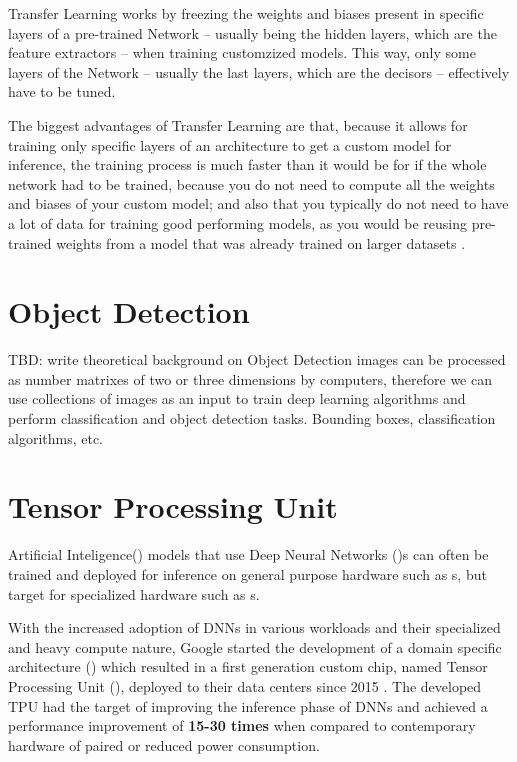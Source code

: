\documentclass[openright]{normas-utf-tex} %
\begin{document}
Transfer Learning works by freezing the weights and biases present in specific layers of a
pre-trained Network -- usually being the hidden layers, which are the feature extractors -- 
when training customzized models. This way,  only some layers of the Network -- usually the last layers, which 
are the decisors -- effectively have to be tuned.

The biggest advantages of Transfer Learning are that, because it allows for
training only specific layers of an architecture to get a custom model for
inference, the training process is much faster than it would be for if the
whole network had to be trained, because you do not need to compute all the
weights and biases of your custom model; and also that you typically do not
need to have a lot of data for training good performing models, as you
would be reusing pre-trained weights from a model that was already trained on
larger datasets \cite{CS231N}.

\section{Object Detection}
TBD: write theoretical background on Object Detection
images can be processed as number matrixes of two or three dimensions by computers, 
therefore we can use collections of images as an input to train deep learning algorithms and
perform classification and object detection tasks. 
Bounding boxes, classification algorithms, etc. 

\section{Tensor Processing Unit}

Artificial Inteligence() models that use Deep Neural 
Networks ()s can often be trained and deployed for inference
on general purpose hardware such as s, but target 
for specialized hardware such as s.

With the increased adoption of DNNs in various workloads and their specialized
and heavy compute nature, Google started the development of a domain specific
architecture () which resulted in a
first generation custom chip, named Tensor Processing Unit (), deployed to their data centers since 2015 \cite{Google2015}.
The developed TPU had the target of improving the inference phase of DNNs and
achieved a performance improvement of \textbf{15-30 times} when compared to
contemporary hardware of paired or reduced power consumption.
\end{document}
